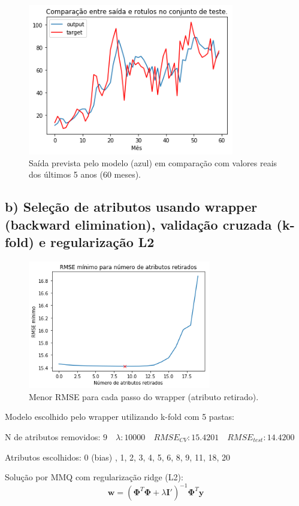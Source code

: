 \documentclass[a4paper, 12pt]{article}
\begin{document}
\begin{figure}[h!]
    \centering
    \includegraphics[width=9cm]{images/raw.png}
    \caption{Saída prevista pelo modelo (azul) em comparação com valores reais dos últimos 5 anos (60 meses).}
\end{figure}

\subsection*{b) Seleção de atributos usando wrapper (backward elimination), validação cruzada (k-fold) e regularização L2}

\begin{figure}[h!]
    \centering
    \includegraphics[width=8cm]{images/backward.png}
    \caption{Menor RMSE para cada passo do wrapper (atributo retirado).}
\end{figure}

Modelo escolhido pelo wrapper utilizando k-fold com 5 pastas:

N de atributos removidos: $9 \quad \lambda: 10000 \quad RMSE_{CV}: 15.4201 \quad RMSE_{test}: 14.4200$

Atributos escolhidos: 0 (bias) , 1, 2, 3, 4, 5, 6, 8, 9, 11, 18, 20

Solução por MMQ com regularização ridge (L2):
\begin{equation}
    \mathbf{w} = (\boldsymbol{\Phi}^T\boldsymbol{\Phi} + \lambda\mathbf{I'})^{-1}\boldsymbol{\Phi}^T\mathbf{y}
\end{equation}
\end{document}
